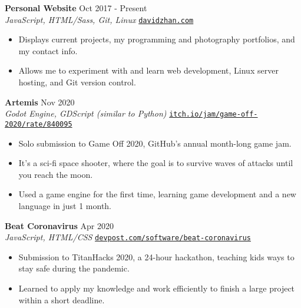 \documentclass[letterpaper,10pt]{extarticle}
\begin{document}
\noindent
\textbf{Personal Website} \hfill Oct 2017 - Present\\ %
\textit{JavaScript, HTML/Sass, Git, Linux} \hfill \texttt{\href{https://davidzhan.com}{davidzhan.com}} %
\begin{itemize}
    \item Displays current projects, my programming and photography portfolios, and my contact info.
    \item Allows me to experiment with and learn web development, Linux server hosting, and Git version control. %
\end{itemize}

\noindent
\textbf{Artemis} \hfill Nov 2020\\ %
\textit{Godot Engine, GDScript (similar to Python)} \hfill \texttt{\href{https://itch.io/jam/game-off-2020/rate/840095}{itch.io/jam/game-off-2020/rate/840095}}
\begin{itemize}
    \item Solo submission to Game Off 2020, GitHub's annual month-long game jam.
    \item It's a sci-fi space shooter, where the goal is to survive waves of attacks until you reach the moon.
    \item Used a game engine for the first time, learning game development and a new language in just 1 month.
\end{itemize}

\noindent
\textbf{Beat Coronavirus} \hfill Apr 2020\\ %
\textit{JavaScript, HTML/CSS} \hfill \texttt{\href{https://devpost.com/software/beat-coronavirus}{devpost.com/software/beat-coronavirus}}
\begin{itemize}
    \item Submission to TitanHacks 2020, a 24-hour hackathon, teaching kids ways to stay safe during the pandemic.
    \item Learned to apply my knowledge and work efficiently to finish a large project within a short deadline.
\end{itemize}
\end{document}
